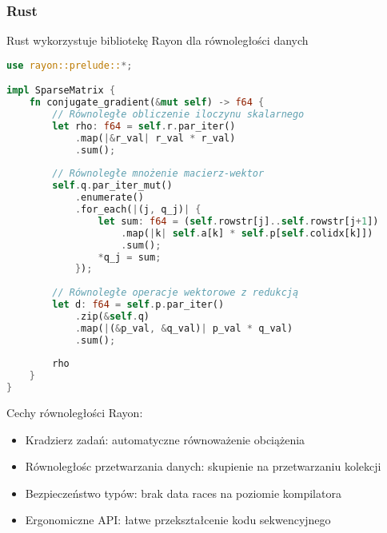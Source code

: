 \subsubsection{Rust}
Rust wykorzystuje bibliotekę Rayon dla równoległości danych
\begin{lstlisting}[language=Rust, caption={Równoległość danych w Rust z Rayon}, label={lst:cg_rust_parallelism}]
use rayon::prelude::*;

impl SparseMatrix {
    fn conjugate_gradient(&mut self) -> f64 {
        // Równoległe obliczenie iloczynu skalarnego
        let rho: f64 = self.r.par_iter()
            .map(|&r_val| r_val * r_val)
            .sum();
        
        // Równoległe mnożenie macierz-wektor
        self.q.par_iter_mut()
            .enumerate()
            .for_each(|(j, q_j)| {
                let sum: f64 = (self.rowstr[j]..self.rowstr[j+1])
                    .map(|k| self.a[k] * self.p[self.colidx[k]])
                    .sum();
                *q_j = sum;
            });
        
        // Równoległe operacje wektorowe z redukcją
        let d: f64 = self.p.par_iter()
            .zip(&self.q)
            .map(|(&p_val, &q_val)| p_val * q_val)
            .sum();
        
        rho
    }
}
\end{lstlisting}
Cechy równoległości Rayon:
\begin{itemize}
    \item Kradzierz zadań: automatyczne równoważenie obciążenia
    \item Równoległośc przetwarzania danych: skupienie na przetwarzaniu kolekcji
    \item Bezpieczeństwo typów: brak data races na poziomie kompilatora
    \item Ergonomiczne API: łatwe przekształcenie kodu sekwencyjnego
\end{itemize}

